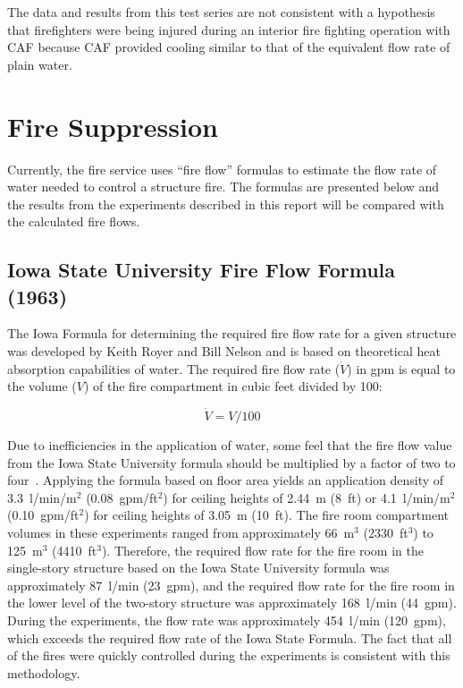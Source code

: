 \documentclass[12pt,oneside]{book}
\begin{document}
The data and results from this test series are not consistent with a hypothesis that firefighters were being injured during an interior fire fighting operation with CAF because CAF provided cooling similar to that of the equivalent flow rate of plain water.

\section{Fire Suppression}
\label{sec:Fire_Suppression_discussion}

Currently, the fire service uses ``fire flow'' formulas to estimate the flow rate of water needed to control a structure fire. The formulas are presented below and the results from the experiments described in this report will be compared with the calculated fire flows.

\subsection{Iowa State University Fire Flow Formula (1963)}
The Iowa Formula for determining the required fire flow rate for a given structure was developed by Keith Royer and Bill Nelson and is based on theoretical heat absorption capabilities of water. The required fire flow rate ($\dot{V}$) in gpm is equal to the volume ($V$) of the fire compartment in cubic feet divided by 100:

\begin{equation}\label{eq:isu_form}
\dot{V} = V / 100
\end{equation}

Due to inefficiencies in the application of water, some feel that the fire flow value from the Iowa State University formula should be multiplied by a factor of two to four~\cite{NFPA}. Applying the formula based on floor area yields an application density of 3.3~l/min/m$^2$ (0.08~gpm/ft$^2$) for ceiling heights of 2.44~m (8~ft) or 4.1~l/min/m$^2$ (0.10~gpm/ft$^2$) for ceiling heights of 3.05~m (10~ft). The fire room compartment volumes in these experiments ranged from approximately 66~m$^3$ (2330~ft$^3$) to 125~m$^3$ (4410~ft$^3$). Therefore, the required flow rate for the fire room in the single-story structure based on the Iowa State University formula was approximately 87~l/min (23~gpm), and the required flow rate for the fire room in the lower level of the two-story structure was approximately 168~l/min (44~gpm). During the experiments, the flow rate was approximately 454~l/min (120~gpm), which exceeds the required flow rate of the Iowa State Formula. The fact that all of the fires were quickly controlled during the experiments is consistent with this methodology. 
\end{document}
